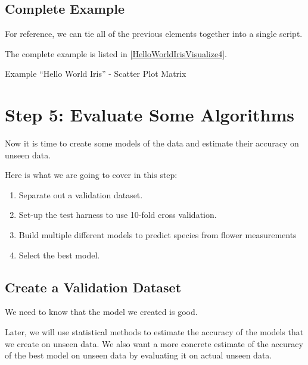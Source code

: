    
    
\subsection{Complete Example}

For reference, we can tie all of the previous elements together into a single script.
    
The complete example is listed in \ref{HelloWorldIrisVisualize4}.

\begin{code}
        
    
    \caption{Example ``Hello World Iris'' - Scatter Plot Matrix} \label{HelloWorldIrisVisualize4}
\end{code}      
    
                
 
       
\section{Step 5: Evaluate Some Algorithms}

Now it is time to create some models of the data and estimate their accuracy on unseen data.
    
Here is what we are going to cover in this step:

\begin{enumerate}
  \item Separate out a validation dataset.
  \item Set-up the test harness to use 10-fold cross validation.
  \item Build multiple different models to predict species from flower measurements
  \item Select the best model.
\end{enumerate}

\subsection{Create a Validation Dataset}

We need to know that the model we created is good.
    
Later, we will use statistical methods to estimate the accuracy of the models that we create on unseen data. We also want a more concrete estimate of the accuracy of the best model on unseen data by evaluating it on actual unseen data.
    
